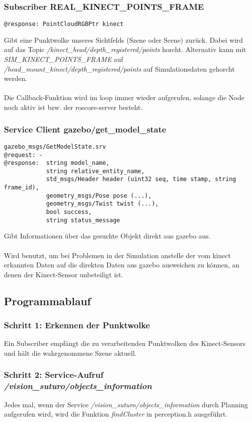 \documentclass{suturo}
\begin{document}
\subsubsection{Subscriber REAL\_KINECT\_POINTS\_FRAME}
\begin{verbatim}
@response: PointCloudRGBPtr kinect
\end{verbatim}
Gibt eine Punktwolke unseres Sichtfelds (Szene oder Scene) zurück. Dabei wird auf das Topic \textit{/kinect\_head/depth\_registered/points} horcht. Alternativ kann mit \textit{SIM\_KINECT\_POINTS\_FRAME} auf \textit{/head\_mount\_kinect/depth\_registered/points} auf Simulationsdaten gehorcht werden.
\\ \\
Die Callback-Funktion wird im loop immer wieder aufgerufen, solange die Node noch aktiv ist bzw. der roscore-server besteht.

\subsubsection{Service Client gazebo/get\_model\_state}
\begin{verbatim}
gazebo_msgs/GetModelState.srv
@request: -
@response:  string model_name,
            string relative_entity_name,
            std_msgs/Header header (uint32 seq, time stamp, string frame_id),
            geometry_msgs/Pose pose (...),
            geometry_msgs/Twist twist (...),
            bool success,
            string status_message
\end{verbatim}
Gibt Informationen über das gesuchte Objekt direkt aus gazebo aus.
\\ \\
Wird benutzt, um bei Problemen in der Simulation anstelle der vom kinect erkannten Daten auf die direkten Daten aus gazebo ausweichen zu können, an denen der Kinect-Sensor unbeteiligt ist.

\subsection{Programmablauf}
\subsubsection{Schritt 1: Erkennen der Punktwolke}
Ein Subscriber empfängt die zu verarbeitenden Punktwolken des Kinect-Sensors und hält die wahrgenommene Szene aktuell.
\subsubsection{Schritt 2: Service-Aufruf \textit{/vision\_suturo/objects\_information}}
Jedes mal, wenn der Service \textit{/vision\_suturo/objects\_information} durch Planning aufgerufen wird, wird die Funktion \textit{findCluster} in perception.h ausgeführt. 
\end{document}
